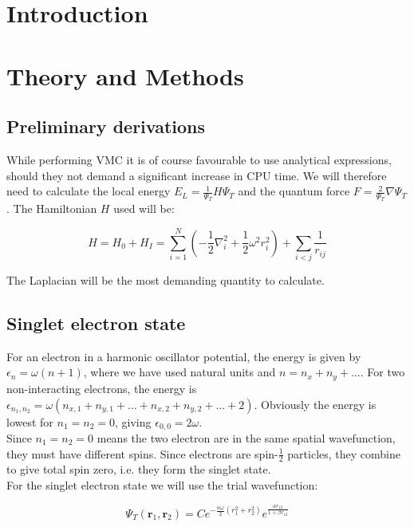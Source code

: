\documentclass[english, a4paper]{article}
\newcommand{\bm}[1]{\mathbf{#1}}
\begin{document}
\section{Introduction}


\section{Theory and Methods}
\subsection{Preliminary derivations}
While performing VMC it is of course favourable to use analytical expressions, should they not demand a significant increase in CPU time. We will therefore need to calculate the local energy $E_L = \frac{1}{\Psi_T}H\Psi_T$ and the quantum force $F = \frac{2}{\Psi_T}\nabla\Psi_T$. The Hamiltonian $H$ used will be:

\begin{equation}
	H = H_0 + H_I = \sum_{i=1}^{N}\left(-\frac{1}{2}\nabla_i^2 + \frac{1}{2}\omega^2r_i^2\right) + \sum_{i<j}\frac{1}{r_{ij}}
\end{equation}

The Laplacian will be the most demanding quantity to calculate.

\subsection{Singlet electron state}
For an electron in a harmonic oscillator potential, the energy is given by $\epsilon_n = \omega(n + 1)$, where we have used natural units and $n = n_x + n_y + \ldots$. For two non-interacting electrons, the energy is $\epsilon_{n_1,n_2} = \omega(n_{x,1} + n_{y,1} + \ldots + n_{x,2} + n_{y,2} + \ldots + 2)$. Obviously the energy is lowest for $n_1 = n_2 = 0$, giving $\epsilon_{0,0} = 2\omega$.\\
Since $n_1=n_2 = 0$ means the two electron are in the same spatial wavefunction, they must have different spins. 
Since electrons are spin-$\frac{1}{2}$ particles, they combine to give total spin zero, i.e. they form the singlet state.\\

For the singlet electron state we will use the trial wavefunction:

\begin{equation}
	\Psi_T(\bm{r}_1,\bm{r}_2) = Ce^{-\frac{\alpha\omega}{2}(r_1^2+r_2^2)}e^{\frac{ar_{12}}{1+\beta r_{12}}}
\end{equation}
\end{document}
